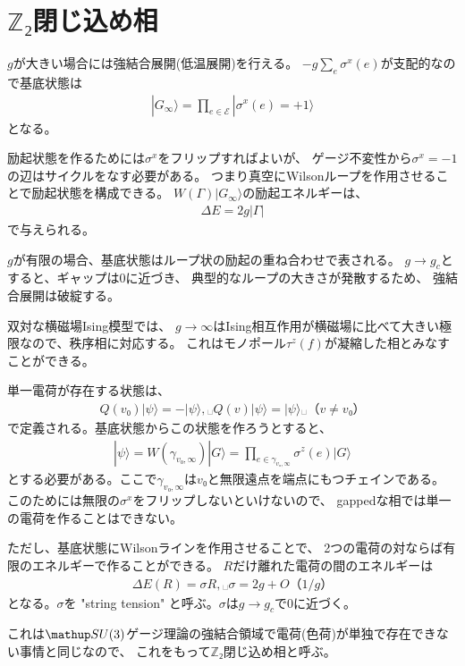 \documentclass[\main/main.tex]{subfiles}
\begin{document}
\section{
    $ℤ₂$閉じ込め相
}
\begin{frame}{\currentname}
    $g$が大きい場合には強結合展開(低温展開)を行える。
    $-g∑_e σ^x(e)$が支配的なので基底状態は
    \begin{align}
        |𝐺_∞⟩ = ∏_{e ∈ ℰ}|σ^x(e) = +1⟩
    \end{align}
    となる。

    励起状態を作るためには$σ^x$をフリップすればよいが、
    ゲージ不変性から$σ^x = -1$の辺はサイクルをなす必要がある。
    つまり真空にWilsonループを作用させることで励起状態を構成できる。
    $W(Γ)|𝐺_∞⟩$の励起エネルギーは、
    \begin{align}
        𝛥E = 2g|Γ|
    \end{align}
    で与えられる。

    $g$が有限の場合、基底状態はループ状の励起の重ね合わせで表される。
    $g → g_𝑐$とすると、ギャップは0に近づき、
    典型的なループの大きさが発散するため、
    強結合展開は破綻する。

    双対な横磁場Ising模型では、
    $g → ∞$はIsing相互作用が横磁場に比べて大きい極限なので、秩序相に対応する。
    これはモノポール$τ^z(f)$が凝縮した相とみなすことができる。
\end{frame}
\begin{frame}{\currentname}
    単一電荷が存在する状態は、
    \begin{align}
        Q(v₀)|ψ⟩ = -|ψ⟩,␣ Q(v)|ψ⟩ = |ψ⟩␣（v ≠ v₀）
    \end{align}
    で定義される。基底状態からこの状態を作ろうとすると、
    \begin{align}
        |ψ⟩ = W(γ_{v₀,∞})|𝐺⟩
        = ∏_{e ∈ γ_{v₀,∞}}σ^z(e) |𝐺⟩
    \end{align}
    とする必要がある。ここで$γ_{v₀,∞}$は$v₀$と無限遠点を端点にもつチェインである。
    このためには無限の$σ^x$をフリップしないといけないので、
    gappedな相では単一の電荷を作ることはできない。

    ただし、基底状態にWilsonラインを作用させることで、
    2つの電荷の対ならば有限のエネルギーで作ることができる。
    $R$だけ離れた電荷の間のエネルギーは
    \begin{align}
        𝛥E(R)  = σR,␣ σ = 2g + O（1/g）
    \end{align}
    となる。$σ$を "string tension" と呼ぶ。$σ$は$g → g_𝑐$で0に近づく。

    これは$\SU(3)$ゲージ理論の強結合領域で電荷(色荷)が単独で存在できない事情と同じなので、
    これをもって$ℤ₂$閉じ込め相と呼ぶ。
\end{frame}
\end{document}
